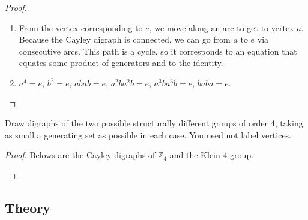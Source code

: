 \begin{proof}
    \begin{enumerate}[label={\textbf{\alph*.}}]
        \item From the vertex corresponding to $e$, we move along an arc to get to vertex $a$. Because the Cayley digraph is connected, we can go from $a$ to $e$ via consecutive arcs. This path is a cycle, so it corresponds to an equation that equates some product of generators and to the identity.
        \item $a^{4} = e$, $b^{2} = e$, $abab = e$, $a^{2}ba^{2}b = e$, $a^{3}ba^{3}b = e$, $baba = e$.
    \end{enumerate}
\end{proof}

\newpage
\begin{exercise}
    Draw digraphs of the two possible structurally different groups of order 4, taking as small a generating set as possible in each case. You need not label vertices.
\end{exercise}

\begin{proof}
    Belows are the Cayley digraphs of $\mathbb{Z}_{4}$ and the Klein 4-group.
    \begin{center}
    \end{center}
\end{proof}

\subsection*{Theory}


